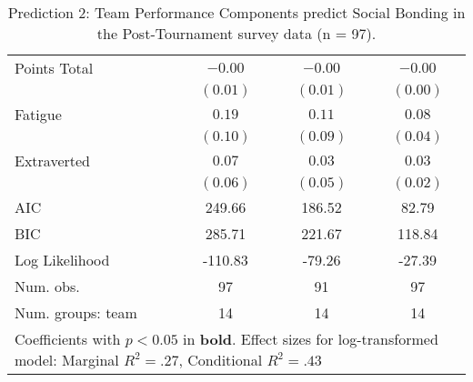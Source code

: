 \begin{table}
\begin{center}
\begin{tabular}{l c c c }
Points Total                                              & $-0.00$              & $-0.00$             & $-0.00$               \\
                                                          & $(0.01)$             & $(0.01)$            & $(0.00)$              \\
Fatigue                                                   & $0.19$               & $0.11$              & $0.08$                \\
                                                          & $(0.10)$             & $(0.09)$            & $(0.04)$              \\
Extraverted                                               & $0.07$               & $0.03$              & $0.03$                \\
                                                          & $(0.06)$             & $(0.05)$            & $(0.02)$              \\
\midrule
AIC                                                       & 249.66               & 186.52              & 82.79                 \\
BIC                                                       & 285.71               & 221.67              & 118.84                \\
Log Likelihood                                            & -110.83              & -79.26              & -27.39                \\
Num. obs.                                                 & 97                   & 91                  & 97                    \\
Num. groups: team                                         & 14                   & 14                  & 14                    \\
\bottomrule
\multicolumn{4}{l}{\scriptsize{Coefficients with $p < 0.05$ in \textbf{bold}. Effect sizes for log-transformed model: Marginal $R^2 = .27$, Conditional $R^2 = .43$}}
\end{tabular}
\caption{Prediction 2: Team Performance Components predict Social Bonding in the Post-Tournament survey data (n = 97).}
\label{tab:MLM3aJointActionSuccessBonding}
\end{center}
\end{table}
